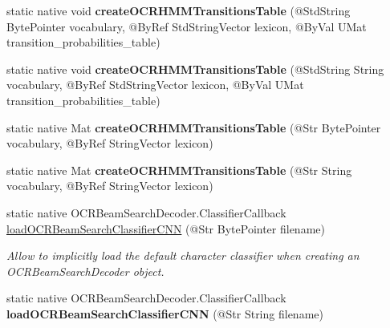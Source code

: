 \begin{DoxyCompactItemize}
static native void {\bfseries create\+O\+C\+R\+H\+M\+M\+Transitions\+Table} (@Std\+String Byte\+Pointer vocabulary, @By\+Ref Std\+String\+Vector lexicon, @By\+Val U\+Mat transition\+\_\+probabilities\+\_\+table)
\item 
\mbox{\label{classorg_1_1bytedeco_1_1javacpp_1_1opencv__text_a1e99292b213c8d913b08cea827c68eb1}} 
static native void {\bfseries create\+O\+C\+R\+H\+M\+M\+Transitions\+Table} (@Std\+String String vocabulary, @By\+Ref Std\+String\+Vector lexicon, @By\+Val U\+Mat transition\+\_\+probabilities\+\_\+table)
\item 
\mbox{\label{classorg_1_1bytedeco_1_1javacpp_1_1opencv__text_a7a29e2f9486226f47cbcec670e8bf838}} 
static native Mat {\bfseries create\+O\+C\+R\+H\+M\+M\+Transitions\+Table} (@Str Byte\+Pointer vocabulary, @By\+Ref String\+Vector lexicon)
\item 
\mbox{\label{classorg_1_1bytedeco_1_1javacpp_1_1opencv__text_a2432d5dfc513418ff6382020af067067}} 
static native Mat {\bfseries create\+O\+C\+R\+H\+M\+M\+Transitions\+Table} (@Str String vocabulary, @By\+Ref String\+Vector lexicon)
\item 
static native O\+C\+R\+Beam\+Search\+Decoder.\+Classifier\+Callback \hyperlink{classorg_1_1bytedeco_1_1javacpp_1_1opencv__text_ac5185baf5c06198df5eb4c500afcbcf0}{load\+O\+C\+R\+Beam\+Search\+Classifier\+C\+NN} (@Str Byte\+Pointer filename)
\begin{DoxyCompactList}\small\item\em Allow to implicitly load the default character classifier when creating an O\+C\+R\+Beam\+Search\+Decoder object. \end{DoxyCompactList}\item 
\mbox{\label{classorg_1_1bytedeco_1_1javacpp_1_1opencv__text_ad5487feed505ad5441870766dc866000}} 
static native O\+C\+R\+Beam\+Search\+Decoder.\+Classifier\+Callback {\bfseries load\+O\+C\+R\+Beam\+Search\+Classifier\+C\+NN} (@Str String filename)
\end{DoxyCompactItemize}
